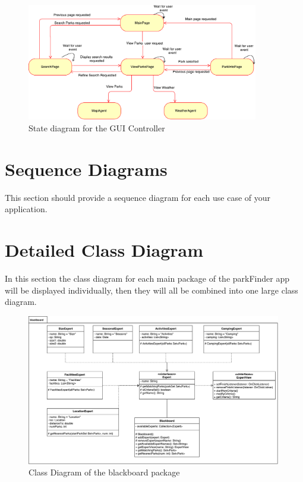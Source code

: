 \documentclass[titlepage,12pt]{article}
\begin{document}
\begin{figure}[H]
    \centerline{\includegraphics[width=0.90\textwidth]{state_diagrams/GUI_Controller}}
    \caption{State diagram for the GUI Controller}
    \label{fig:gui_controller}
\end{figure}


\section{Sequence Diagrams}
\label{sec:sequence_diagrams}
This section should provide a sequence diagram for each use case of your application.



\section{Detailed Class Diagram}
\label{sec:detailed_class_diagram}
In this section the class diagram for each main package of the parkFinder app will be displayed
individually, then they will all be combined into one large class diagram.

\begin{figure}[H]
    \centerline{\includegraphics[width=0.99\textwidth]{class_diagrams/blackboard_ClassDiagram}}
    \caption{Class Diagram of the blackboard package}
    \label{fig:blackboard_classDiagram}
\end{figure}
\end{document}
